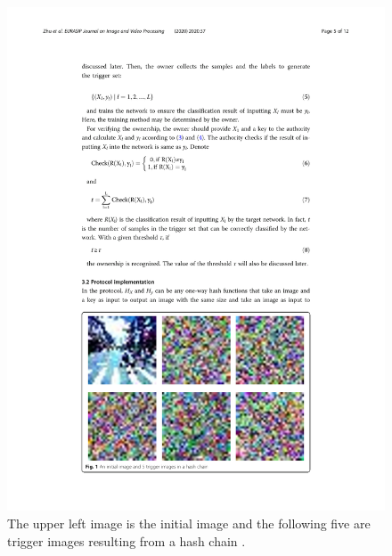 \begin{figure}[t]
    \centering
    \includegraphics[width = 0.4 \textwidth]{images/Zhu1.pdf}
    \caption{The upper left image is the initial image and the following five are trigger images resulting from a hash chain \cite{zhu_secure_2020}.}
    \label{fig:zhu}
\end{figure}